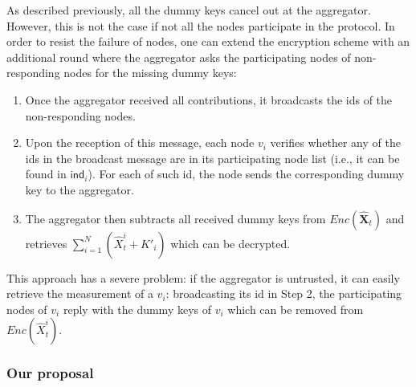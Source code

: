 \documentclass[11pt,a4paper]{article}
\theoremstyle{plain}
\theoremstyle{plain}
\theoremstyle{plain}
\theoremstyle{plain}
\theoremstyle{nonumberplain} \theoremseparator{}
\begin{document}
As described previously, all the dummy keys cancel out at the aggregator.
However, this is not the case if not all the nodes participate in the protocol. In order to resist the failure of nodes, one can extend the encryption scheme with an additional round where the 
aggregator asks the participating nodes of non-responding nodes for the missing dummy keys:
\begin{enumerate}
\item Once the aggregator received all contributions, it broadcasts the ids of the non-responding nodes. 
\item Upon the reception of this message, each node $v_{i}$ verifies whether any of the ids in the broadcast message are in its participating node list (i.e., it can be found in $\mathsf{ind}_{i}$). For each of such id, the node sends the corresponding dummy key to the aggregator.
\item The aggregator then subtracts all received dummy keys from $\mathit{Enc}(\hat{\mathbf{X}}_{t})$ and retrieves  $\sum^N_{i=1} (\hat{X}_{t}^{i} + K'_i)$ which can be decrypted.
\end{enumerate}

This approach has a severe problem: if the aggregator is untrusted, it can easily retrieve the measurement of a $v_{i}$: broadcasting its id in Step 2, the participating nodes of $v_i$ reply with the dummy keys of $v_i$ which can be removed from $\mathit{Enc}(\hat{X}_{t}^{i})$. 


\subsubsection{Our proposal} 
\label{sec:advanced} 
\end{document}
